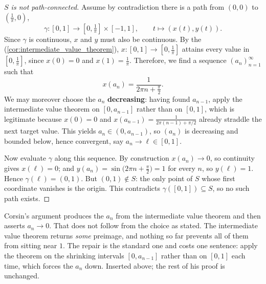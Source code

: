\begin{proof}[$S$ is not path-connected]
Assume by contradiction there is a path from $(0,0)$ to $(\tfrac{1}{\pi}, 0)$,
\[
\gamma : [0,1] \to [0, \tfrac{1}{\pi}] \times [-1,1], \qquad t \mapsto (x(t), y(t)).
\]
Since $\gamma$ is continuous, $x$ and $y$ must also be continuous. By the  (\cref{cor:intermediate_value_theorem}), $x : [0,1] \to [0,\tfrac{1}{\pi}]$
attains every value in $[0,\tfrac{1}{\pi}]$, since $x(0) = 0$ and $x(1) = \tfrac{1}{\pi}$.
Therefore, we find a sequence $(a_n)_{n=1}^{\infty}$ such that
\[
x(a_n) = \frac{1}{2\pi n + \tfrac{\pi}{2}}.
\]
We may moreover choose the $a_n$ \textbf{decreasing}: having found $a_{n-1}$, apply the
intermediate value theorem on $[0,a_{n-1}]$ rather than on $[0,1]$, which is legitimate because
$x(0) = 0$ and $x(a_{n-1}) = \tfrac{1}{2\pi(n-1)+\pi/2}$ already straddle the next target value.
This yields $a_n \in (0,a_{n-1})$, so $(a_n)$ is decreasing and bounded below, hence convergent,
say $a_n \to \ell \in [0,1]$.

Now evaluate $\gamma$ along this sequence. By construction $x(a_n) \to 0$, so continuity gives
$x(\ell) = 0$; and $y(a_n) = \sin\!\big(2\pi n + \tfrac\pi2\big) = 1$ for every $n$, so
$y(\ell) = 1$. Hence $\gamma(\ell) = (0,1)$. But $(0,1) \notin S$: the only point of $S$ whose
first coordinate vanishes is the origin. This contradicts $\gamma([0,1]) \subseteq S$, so no
such path exists.
\end{proof}

\begin{ainote}
Corsin's argument produces the $a_n$ from the intermediate value theorem and then asserts
$a_n \to 0$. That does not follow from the choice as stated. The intermediate value theorem
returns \emph{some} preimage, and nothing so far prevents all of them from sitting near $1$.
The repair is the standard one and costs one sentence: apply the theorem on the shrinking
intervals $[0,a_{n-1}]$ rather than on $[0,1]$ each time, which forces the $a_n$ down. Inserted
above; the rest of his proof is unchanged.
\end{ainote}

